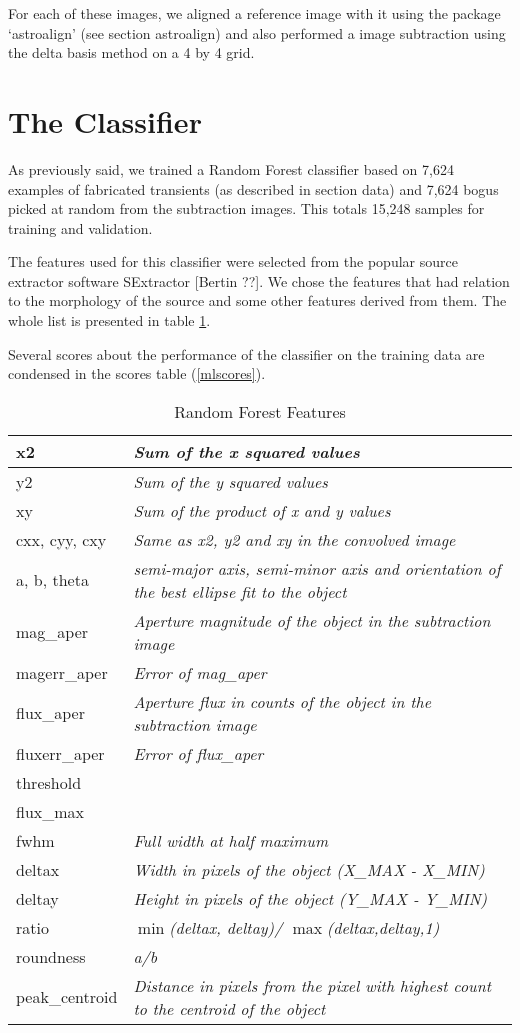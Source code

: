 For each of these images, we aligned a reference image with it using the package `astroalign' (see section astroalign) and also performed a image subtraction using the delta basis method on a 4 by 4 grid.

\section{The Classifier}

As previously said, we trained a Random Forest classifier based on 7,624 examples of fabricated transients (as described in section data) and 7,624 bogus picked at random from the subtraction images. This totals 15,248 samples for training and validation.

The features used for this classifier were selected from the popular source extractor software SExtractor [Bertin ??]. We chose the features that had relation to the morphology of the source and some other features derived from them.
The whole list is presented in table \ref{mlfeatures}.

Several scores about the performance of the classifier on the training data are condensed in the scores table (\ref{mlscores}).

\begin{table}
\centering
\begin{tabular}{|l| >{\itshape}l|}
  \hline
  x2 & Sum of the x squared values \\ \hline
  y2 & Sum of the y squared values \\ \hline
  xy & Sum of the product of x and y values \\ \hline
  cxx, cyy, cxy & Same as x2, y2 and xy in the convolved image  \\ \hline
  a, b, theta & semi-major axis, semi-minor axis and orientation of the best ellipse fit to the object \\ \hline
  mag\_aper & Aperture magnitude of the object in the subtraction image \\ \hline     magerr\_aper & Error of mag\_aper \\ \hline
  flux\_aper & Aperture flux in counts of the object in the subtraction image \\ \hline
  fluxerr\_aper & Error of flux\_aper \\ \hline
threshold & \\ \hline
flux\_max & \\ \hline
fwhm & Full width at half maximum \\ \hline
deltax & Width in pixels of the object (X\_MAX - X\_MIN) \\ \hline
deltay & Height in pixels of the object (Y\_MAX - Y\_MIN) \\ \hline
ratio & $\min$(deltax, deltay)/ $\max$(deltax,deltay,1) \\ \hline
roundness & a/b\\ \hline
peak\_centroid & Distance in pixels from the pixel with highest count to the centroid of the object \\ \hline
\end{tabular}
\caption{Random Forest Features}
\label{mlfeatures}
\end{table}

